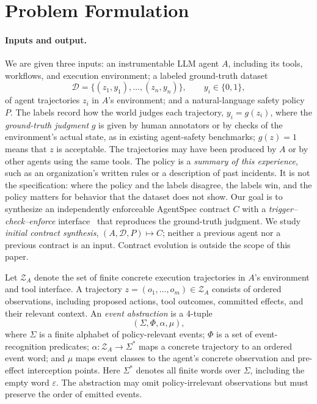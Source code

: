 \section{Problem Formulation}\label{sec:problem}
\paragraph{Inputs and output.}
We are given three inputs: an instrumentable LLM agent $A$, including its tools, workflows, and execution environment; a labeled ground-truth dataset
\[
  \mathcal{D}=\{(z_1,y_1),\ldots,(z_n,y_n)\},\qquad y_i\in\{0,1\},
\]
of agent trajectories $z_i$ in $A$'s environment; and a natural-language safety policy $P$. The labels record how the world judges each trajectory, $y_i=g(z_i)$, where the \emph{ground-truth judgment} $g$ is given by human annotators or by checks of the environment's actual state, as in existing agent-safety benchmarks; $g(z)=1$ means that $z$ is acceptable. The trajectories may have been produced by $A$ or by other agents using the same tools. The policy is a \emph{summary of this experience}, such as an organization's written rules or a description of past incidents. It is not the specification: where the policy and the labels disagree, the labels win, and the policy matters for behavior that the dataset does not show. Our goal is to synthesize an independently enforceable AgentSpec contract $C$ with a \emph{trigger--check--enforce} interface~\cite{wang2026agentspec} that reproduces the ground-truth judgment. We study \emph{initial contract synthesis}, $(A,\mathcal{D},P)\mapsto C$; neither a previous agent nor a previous contract is an input. Contract evolution is outside the scope of this paper.

\begin{definition}\label{def:event-abstraction}
Let $\mathcal{Z}_A$ denote the set of finite concrete execution trajectories in $A$'s environment and tool interface. A trajectory $z=(o_1,\ldots,o_m)\in\mathcal{Z}_A$ consists of ordered observations, including proposed actions, tool outcomes, committed effects, and their relevant context. An \emph{event abstraction} is a 4-tuple
\[
  (\Sigma,\Phi,\alpha,\mu),
\]
where $\Sigma$ is a finite alphabet of policy-relevant events; $\Phi$ is a set of event-recognition predicates; $\alpha:\mathcal{Z}_A\rightarrow\Sigma^*$ maps a concrete trajectory to an ordered event word; and $\mu$ maps event classes to the agent's concrete observation and pre-effect interception points. Here $\Sigma^*$ denotes all finite words over $\Sigma$, including the empty word $\varepsilon$. The abstraction may omit policy-irrelevant observations but must preserve the order of emitted events.
\end{definition}

